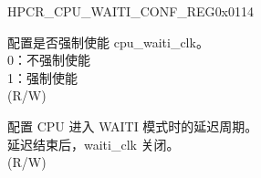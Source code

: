 \begin{register}{H}{PCR\_CPU\_WAITI\_CONF\_REG}{0x0114}\label{regdesc:PCRCPUWAITICONFREG}
%
%
%
%
\regnewline%
\begin{regdesc}\begin{reglist}
\label{fielddesc:PCRCPUWAITMODEFORCEON}\item [PCR\_CPU\_WAIT\_MODE\_FORCE\_ON] 配置是否强制使能 cpu\_waiti\_clk。\\
0：不强制使能\\
1：强制使能\\(R/W)
\label{fielddesc:PCRCPUWAITIDELAYNUM}\item [PCR\_CPU\_WAITI\_DELAY\_NUM] 配置 CPU 进入 WAITI 模式时的延迟周期。\\
延迟结束后，waiti\_clk 关闭。\\ (R/W)
\end{reglist}\end{regdesc}
\end{register}


